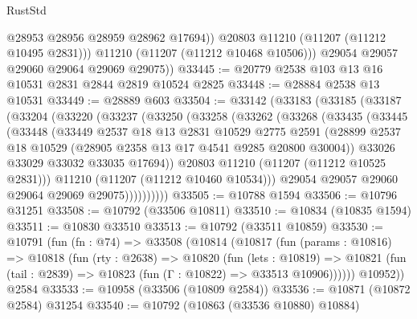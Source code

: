 \begin{lexlean}{RustStd}
\begin{coremodule}
                @28953
                @28956
                @28959
                @28962
                @17694))
            @20803
            @11210
            (@11207 (@11212 @10495 @2831)))
          @11210
          (@11207 (@11212 @10468 @10506)))
        @29054
        @29057
        @29060
        @29064
        @29069
        @29075))
@33445 := @20779 @2538 @103 @13 @16 @10531 @2831 @2844 @2819 @10524 @2825
@33448 := @28884 @2538 @13 @10531
@33449 := @28889 @603
@33504 := @33142
    (@33183
      (@33185
        (@33187
          (@33204
            (@33220
              (@33237
                (@33250
                  (@33258
                    (@33262
                      (@33268
                        (@33435
                          (@33445
                            (@33448
                              (@33449
                                @2537
                                @18
                                @13
                                @2831
                                @10529
                                @2775
                                @2591
                                (@28899
                                  @2537
                                  @18
                                  @10529
                                  (@28905 @2358 @13 @17 @4541 @9285 @20800 @30004))
                                @33026
                                @33029
                                @33032
                                @33035
                                @17694))
                            @20803
                            @11210
                            (@11207 (@11212 @10525 @2831)))
                          @11210
                          (@11207 (@11212 @10460 @10534)))
                        @29054
                        @29057
                        @29060
                        @29064
                        @29069
                        @29075))))))))))
@33505 := @10788 @1594
@33506 := @10796 @31251
@33508 := @10792 (@33506 @10811)
@33510 := @10834 (@10835 @1594)
@33511 := @10830 @33510
@33513 := @10792 (@33511 @10859)
@33530 := @10791
    (fun (fn : @74) =>
    @33508
      (@10814
        (@10817
          (fun (params : @10816) =>
          @10818
            (fun (rty : @2638) =>
            @10820
              (fun (lets : @10819) =>
              @10821 (fun (tail : @2839) => @10823 (fun (Γ : @10822) => @33513 @10906))))))
        @10952))
    @2584
@33533 := @10958 (@33506 (@10809 @2584))
@33536 := @10871 (@10872 @2584) @31254
@33540 := @10792 (@10863 (@33536 @10880) @10884)

\end{coremodule}
\end{lexlean}
